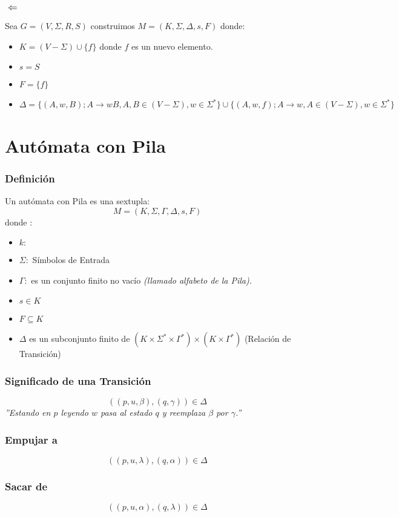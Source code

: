 \subsubsection*{$\Leftarrow$}
Sea $G = (V,\Sigma,R,S)$ construimos $M=(K,\Sigma,\Delta,s,F)$ donde:
\begin{itemize}
\item $K = (V-\Sigma) \cup \{f\}$ donde $f$ es un nuevo elemento.
\item $s=S$
\item $F=\{f\}$
\item $\Delta = \big\{ (A,w,B);A\rightarrow wB, A,B \in (V-\Sigma) ,w \in \Sigma^* \big\} \cup \big\{ (A,w,f);A\rightarrow w, A \in (V-\Sigma) ,w \in \Sigma^* \big\}$
\end{itemize}
\section{Autómata con Pila}
\subsubsection{Definición}
Un autómata con Pila es una sextupla:
$$
M = (K,\Sigma,\Gamma,\Delta,s,F)
$$
donde :
\begin{itemize}
\item $k:$ 
\item $\Sigma:$ Símbolos de Entrada
\item $\Gamma:$ es un conjunto finito no vacío \textit{(llamado alfabeto de la Pila).}
\item $s\in K$
\item $F \subseteq K$
\item $\Delta$ es un subconjunto finito de $(K\times\Sigma^*\times\Gamma^* ) \times (K\times\Gamma^*)$ (Relación de Transición)  
\end{itemize}
\subsubsection*{Significado de una Transición}
$$
((p,u,\beta),(q,\gamma)) \in \Delta
$$
\textit{''Estando en $p$ leyendo $w$ pasa al estado $q$ y reemplaza $\beta$ por $\gamma$.''}
\subsubsection*{Empujar a}
$$
((p,u,\lambda),(q,\alpha))\in\Delta
$$
\subsubsection*{Sacar de}
$$
((p,u,\alpha),(q,\lambda))\in\Delta
$$
